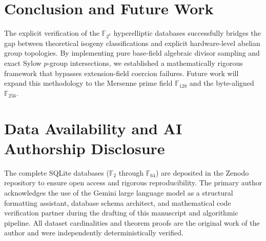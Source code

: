 \documentclass[letterpaper, 11pt]{article}
\begin{document}
\section{Conclusion and Future Work}
The explicit verification of the $\mathbb{F}_{2^k}$ hyperelliptic databases successfully bridges the gap between theoretical isogeny classifications and explicit hardware-level abelian group topologies. By implementing pure base-field algebraic divisor sampling and exact Sylow $p$-group intersections, we established a mathematically rigorous framework that bypasses extension-field coercion failures. Future work will expand this methodology to the Mersenne prime field $\mathbb{F}_{128}$ and the byte-aligned $\mathbb{F}_{256}$.

\section{Data Availability and AI Authorship Disclosure}
The complete SQLite databases ($\mathbb{F}_{2}$ through $\mathbb{F}_{64}$) are deposited in the Zenodo repository to ensure open access and rigorous reproducibility. The primary author acknowledges the use of the Gemini large language model \cite{Gemini2026} as a structural formatting assistant, database schema architect, and mathematical code verification partner during the drafting of this manuscript and algorithmic pipeline. All dataset cardinalities and theorem proofs are the original work of the author and were independently deterministically verified.
\end{document}
